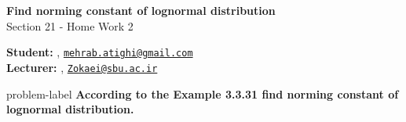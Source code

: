






	\begin{Large}
		\textsf{\textbf{Find norming constant of lognormal distribution}}\\
		Section 21 - Home Work 2
	\end{Large}
	
	\vspace{1ex}
	
	\textsf{\textbf{Student:}} , \href{mailto:mehrab.atighi@gmail.com}{\texttt{mehrab.atighi@gmail.com}}\\
	\textsf{\textbf{Lecturer:}} , \href{mailto:Zokaei@sbu.ac.ir}{\texttt{Zokaei@sbu.ac.ir}}
	
	
	\vspace{2ex}
	
	\begin{problem}{}{problem-label}
		\textbf{According to the Example 3.3.31 find norming constant of lognormal distribution.}
		\cite{Embrechts.etal1997}
	\end{problem}
	
